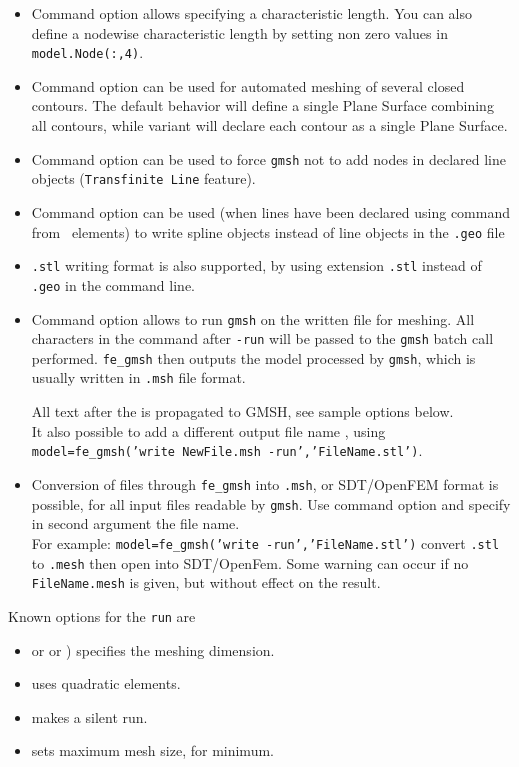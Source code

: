 \begin{itemize}
\item Command option  allows specifying a characteristic length. You can also define a nodewise characteristic length by setting non zero values in {\tt model.Node(:,4)}.
\item Command option  can be used for automated meshing of several closed contours. The default behavior will define a single Plane Surface combining all contours, while  variant will declare each contour as a single Plane Surface.
\item Command option  can be used to force {\tt gmsh} not to add nodes in declared line objects ({\tt Transfinite Line} feature).
\item Command option  can be used (when lines have been declared using command  from ~elements) to write spline objects instead of line objects in the {\tt .geo} file
\item {\tt .stl} writing format is also supported, by using extension {\tt .stl} instead of {\tt .geo} in the command line.
\item Command option  allows to run {\tt gmsh} on the written file for meshing. All characters in the command after {\tt -run} will be passed to the {\tt gmsh} batch call performed. {\tt fe\_gmsh} then outputs the model processed by {\tt gmsh}, which is usually written in {\tt .msh} file format.

All text after the  is propagated to GMSH, see sample options below. \\
It also possible to add a different output file name , using  {\tt model=fe\_gmsh('write NewFile.msh -run','FileName.stl')}.

\item Conversion of files through {\tt fe\_gmsh} into {\tt .msh}, or SDT/OpenFEM format is possible, for all input files readable by {\tt gmsh}. Use command option  and specify in second argument the file name.\\ 
For example: {\tt model=fe\_gmsh('write -run','FileName.stl')} convert {\tt .stl} to {\tt .mesh} then open into SDT/OpenFem. Some warning can occur if no {\tt FileName.mesh} is given, but without effect on the result. \\
\end{itemize}

Known options for the {\tt run} are
\begin{itemize}
\item {} or  or ) specifies the meshing dimension.
\item {} uses quadratic elements.
\item {} makes a silent run. 
\item {} sets maximum mesh size,  for minimum.
\end{itemize}

